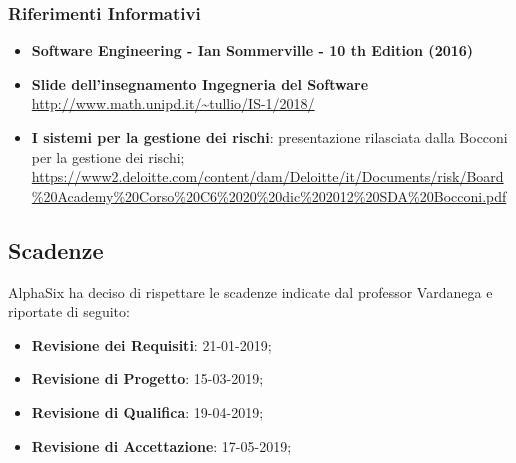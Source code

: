 		\subsubsection{Riferimenti Informativi}
			\begin{itemize}
				\item \textbf{Software Engineering - Ian Sommerville - 10 th Edition (2016)}
				\item \textbf{Slide dell’insegnamento Ingegneria del Software}\\
				\url{http://www.math.unipd.it/~tullio/IS-1/2018/}
				\item \textbf{I sistemi per la gestione dei rischi}: presentazione rilasciata dalla Bocconi per la gestione dei rischi;\\
				\url{https://www2.deloitte.com/content/dam/Deloitte/it/Documents/risk/Board\%20Academy\%20Corso\%20C6\%2020\%20dic\%202012\%20SDA\%20Bocconi.pdf}
			\end{itemize}
		
	\subsection{Scadenze}
	AlphaSix ha deciso di rispettare le scadenze indicate dal professor Vardanega e riportate di seguito:
	\begin{itemize}
		\item \textbf{Revisione dei Requisiti}: 21-01-2019;
		\item \textbf{Revisione di Progetto}: 15-03-2019;
		\item \textbf{Revisione di Qualifica}: 19-04-2019;
		\item \textbf{Revisione di Accettazione}: 17-05-2019;
	\end{itemize}
	
